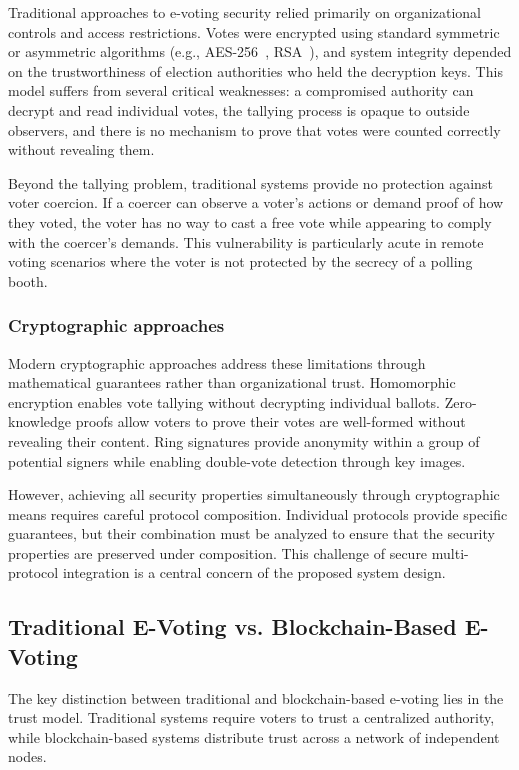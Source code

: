 Traditional approaches to e-voting security relied primarily on organizational controls and access restrictions. Votes were encrypted using standard symmetric or asymmetric algorithms (e.g., AES-256~\cite{nist_aes}, RSA~\cite{rivest1978rsa}), and system integrity depended on the trustworthiness of election authorities who held the decryption keys. This model suffers from several critical weaknesses: a compromised authority can decrypt and read individual votes, the tallying process is opaque to outside observers, and there is no mechanism to prove that votes were counted correctly without revealing them.

Beyond the tallying problem, traditional systems provide no protection against voter coercion. If a coercer can observe a voter's actions or demand proof of how they voted, the voter has no way to cast a free vote while appearing to comply with the coercer's demands. This vulnerability is particularly acute in remote voting scenarios where the voter is not protected by the secrecy of a polling booth.

\subsubsection{Cryptographic approaches}
\label{subsubsec:crypto-approaches}

Modern cryptographic approaches address these limitations through mathematical guarantees rather than organizational trust. Homomorphic encryption enables vote tallying without decrypting individual ballots. Zero-knowledge proofs allow voters to prove their votes are well-formed without revealing their content. Ring signatures provide anonymity within a group of potential signers while enabling double-vote detection through key images.

However, achieving all security properties simultaneously through cryptographic means requires careful protocol composition. Individual protocols provide specific guarantees, but their combination must be analyzed to ensure that the security properties are preserved under composition. This challenge of secure multi-protocol integration is a central concern of the proposed system design.

\subsection{Traditional E-Voting vs. Blockchain-Based E-Voting}
\label{subsec:traditional-vs-blockchain}

The key distinction between traditional and blockchain-based e-voting lies in the trust model. Traditional systems require voters to trust a centralized authority, while blockchain-based systems distribute trust across a network of independent nodes.

